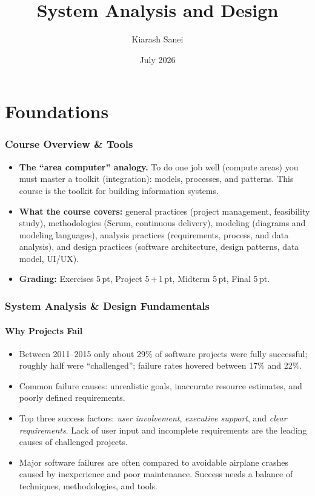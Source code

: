 \documentclass[hidelinks]{article}
\title{\color{carminered}\textbf{System Analysis and Design}}
\author{\color{Thistle}Kiarash Sanei}
\date{\color{SkyBlue}July 2026}
\begin{document}
\maketitle

\begin{Large}
\tableofcontents
\end{Large}
\newpage

\part{Foundations}

\section{Course Overview \& Tools}
\begin{itemize}
  \item \textbf{The ``area computer'' analogy.} To do one job well (compute areas) you must
        master a toolkit (integration): models, processes, and patterns. This course is the
        toolkit for building information systems.
  \item \textbf{What the course covers:} general practices (project management, feasibility
        study), methodologies (Scrum, continuous delivery), modeling (diagrams and modeling
        languages), analysis practices (requirements, process, and data analysis), and design
        practices (software architecture, design patterns, data model, UI/UX).
  \item \textbf{Grading:} Exercises 5\,pt, Project 5\,+\,1\,pt, Midterm 5\,pt, Final 5\,pt.
\end{itemize}

\section{System Analysis \& Design Fundamentals}

\subsection{Why Projects Fail}
\begin{itemize}
  \item Between 2011--2015 only about 29\% of software projects were fully successful;
        roughly half were ``challenged''; failure rates hovered between 17\% and 22\%.
  \item Common failure causes: unrealistic goals, inaccurate resource estimates, and poorly
        defined requirements.
  \item Top three success factors: \emph{user involvement}, \emph{executive support},
        and \emph{clear requirements}. Lack of user input and incomplete requirements are
        the leading causes of challenged projects.
  \item Major software failures are often compared to avoidable airplane crashes caused by
        inexperience and poor maintenance. Success needs a balance of techniques,
        methodologies, and tools.
\end{itemize}
\end{document}
